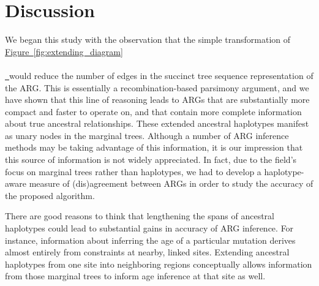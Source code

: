 \documentclass[10pt,twoside,lineno]{gsajnl}
\newcommand*{\figref}[2][]{%
	\hyperref[{#2}]{%
		Figure~\ref*{#2}%
		\ifx\\#1\\%
		\else
		\,#1%
		\fi
	}%
}
\begin{document}
%    
%


\section{Discussion}

We began this study with the observation that the simple transformation
of \figref{fig:extending_diagram} would reduce the number of edges
in the succinct tree sequence representation of the ARG.
This is essentially a recombination-based parsimony argument,
and we have shown that this line of reasoning
leads to ARGs that are substantially more compact and faster to operate on,
and that contain more complete information about true ancestral relationships.
These extended ancestral haplotypes manifest as unary nodes in the marginal trees.
Although a number of ARG inference methods may be taking advantage of this information,
it is our impression that this source of information is not widely appreciated.
In fact, due to the field's focus on marginal trees rather than haplotypes,
we had to develop a haplotype-aware measure of (dis)agreement between ARGs in order to study the accuracy of the proposed algorithm.

There are good reasons to think that lengthening the spans of ancestral haplotypes
could lead to substantial gains in accuracy of ARG inference.
For instance, information about inferring the age of a particular mutation
derives almost entirely from constraints at nearby, linked sites.
Extending ancestral haplotypes from one site into neighboring regions
conceptually allows information from those marginal trees
to inform age inference at that site as well.
\end{document}

